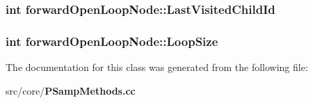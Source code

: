 \subsubsection{\setlength{\rightskip}{0pt plus 5cm}int {\bf forward\-Open\-Loop\-Node::Last\-Visited\-Child\-Id}}\label{classforwardOpenLoopNode_4b3e8c76f910b6ca4d86cffeccab08d2}


\subsubsection{\setlength{\rightskip}{0pt plus 5cm}int {\bf forward\-Open\-Loop\-Node::Loop\-Size}}\label{classforwardOpenLoopNode_6c7f199d6a6bf247511365d49fabfed3}




The documentation for this class was generated from the following file:\begin{CompactItemize}
\item 
src/core/{\bf PSamp\-Methods.cc}\end{CompactItemize}
